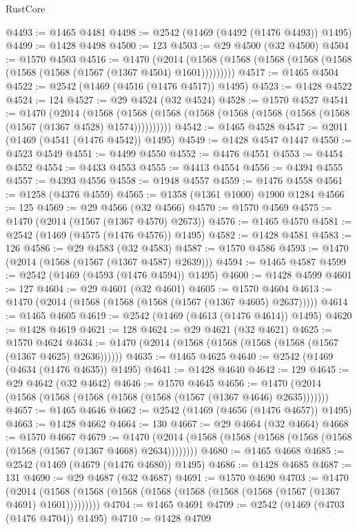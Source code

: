 \begin{lexlean}{RustCore}
\begin{coremodule}
@4493 := @1465 @4481
@4498 := @2542 (@1469 (@4492 (@1476 @4493)) @1495)
@4499 := @1428 @4498
@4500 := 123
@4503 := @29 @4500 (@32 @4500)
@4504 := @1570 @4503
@4516 := @1470
    (@2014 (@1568 (@1568 (@1568 (@1568 (@1568 (@1568 (@1568 (@1567 (@1367 @4504) @1601)))))))))
@4517 := @1465 @4504
@4522 := @2542 (@1469 (@4516 (@1476 @4517)) @1495)
@4523 := @1428 @4522
@4524 := 124
@4527 := @29 @4524 (@32 @4524)
@4528 := @1570 @4527
@4541 := @1470
    (@2014
      (@1568 (@1568 (@1568 (@1568 (@1568 (@1568 (@1568 (@1568 (@1567 (@1367 @4528) @1574))))))))))
@4542 := @1465 @4528
@4547 := @2011 (@1469 (@4541 (@1476 @4542)) @1495)
@4549 := @1428 @4547 @1447
@4550 := @4523 @4549
@4551 := @4499 @4550
@4552 := @4476 @4551
@4553 := @4454 @4552
@4554 := @4433 @4553
@4555 := @4413 @4554
@4556 := @4394 @4555
@4557 := @4393 @4556
@4558 := @1948 @4557
@4559 := @1476 @4558
@4561 := @1258 (@4376 @4559)
@4565 := @1358 (@1361 @1000) @1900 @1284
@4566 := 125
@4569 := @29 @4566 (@32 @4566)
@4570 := @1570 @4569
@4575 := @1470 (@2014 (@1567 (@1367 @4570) @2673))
@4576 := @1465 @4570
@4581 := @2542 (@1469 (@4575 (@1476 @4576)) @1495)
@4582 := @1428 @4581
@4583 := 126
@4586 := @29 @4583 (@32 @4583)
@4587 := @1570 @4586
@4593 := @1470 (@2014 (@1568 (@1567 (@1367 @4587) @2639)))
@4594 := @1465 @4587
@4599 := @2542 (@1469 (@4593 (@1476 @4594)) @1495)
@4600 := @1428 @4599
@4601 := 127
@4604 := @29 @4601 (@32 @4601)
@4605 := @1570 @4604
@4613 := @1470 (@2014 (@1568 (@1568 (@1568 (@1567 (@1367 @4605) @2637)))))
@4614 := @1465 @4605
@4619 := @2542 (@1469 (@4613 (@1476 @4614)) @1495)
@4620 := @1428 @4619
@4621 := 128
@4624 := @29 @4621 (@32 @4621)
@4625 := @1570 @4624
@4634 := @1470 (@2014 (@1568 (@1568 (@1568 (@1568 (@1567 (@1367 @4625) @2636))))))
@4635 := @1465 @4625
@4640 := @2542 (@1469 (@4634 (@1476 @4635)) @1495)
@4641 := @1428 @4640
@4642 := 129
@4645 := @29 @4642 (@32 @4642)
@4646 := @1570 @4645
@4656 := @1470 (@2014 (@1568 (@1568 (@1568 (@1568 (@1568 (@1567 (@1367 @4646) @2635)))))))
@4657 := @1465 @4646
@4662 := @2542 (@1469 (@4656 (@1476 @4657)) @1495)
@4663 := @1428 @4662
@4664 := 130
@4667 := @29 @4664 (@32 @4664)
@4668 := @1570 @4667
@4679 := @1470 (@2014 (@1568 (@1568 (@1568 (@1568 (@1568 (@1568 (@1567 (@1367 @4668) @2634))))))))
@4680 := @1465 @4668
@4685 := @2542 (@1469 (@4679 (@1476 @4680)) @1495)
@4686 := @1428 @4685
@4687 := 131
@4690 := @29 @4687 (@32 @4687)
@4691 := @1570 @4690
@4703 := @1470
    (@2014 (@1568 (@1568 (@1568 (@1568 (@1568 (@1568 (@1568 (@1567 (@1367 @4691) @1601)))))))))
@4704 := @1465 @4691
@4709 := @2542 (@1469 (@4703 (@1476 @4704)) @1495)
@4710 := @1428 @4709

\end{coremodule}
\end{lexlean}
